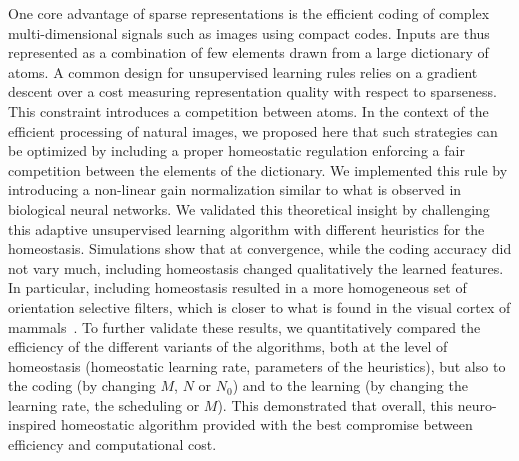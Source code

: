 \documentclass[vision,article,submit,oneauthor,pdftex]{Definitions/mdpi}
\begin{document}
{\begin{figure}
{\label{fig:CNN}}%
\end{figure}%
One core advantage of sparse representations is the efficient coding of complex multi-dimensional signals such as images using compact codes. Inputs are thus represented as a combination of few elements drawn from a large dictionary of atoms. A common design for unsupervised learning rules relies on a gradient descent over a cost measuring representation quality with respect to sparseness. This constraint introduces a competition between atoms. In the context of the efficient processing of natural images, we proposed here that such strategies can be optimized by including a proper homeostatic regulation enforcing a fair competition between the elements of the dictionary. We implemented this rule by introducing a non-linear gain normalization similar to what is observed in biological neural networks. We validated this theoretical insight by challenging this adaptive unsupervised learning algorithm with different heuristics for the homeostasis. Simulations show that at convergence, while the coding accuracy did not vary much, including homeostasis changed qualitatively the learned features. In particular, including homeostasis resulted in a more homogeneous set of orientation selective filters, which is closer to what is found in the visual cortex of mammals~\citep{Ringach02,Rehn07,Loxley17}. To further validate these results, we quantitatively compared the efficiency of the different variants of the algorithms, both at the level of homeostasis (homeostatic learning rate, parameters of the heuristics), but also to the coding (by changing $M$, $N$ or $N_0$) and to the learning (by changing the learning rate, the scheduling or $M$). This demonstrated that overall, this neuro-inspired homeostatic algorithm provided with the best compromise between efficiency and computational cost.

}
\end{document}
